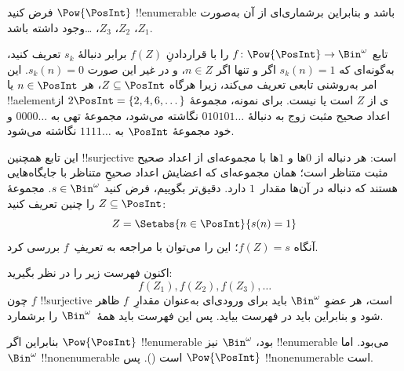  {
  فرض کنید $\Pow{\PosInt}$ !!{enumerable} باشد و بنابراین برشماری‌ای از
  آن به‌صورت $Z_{1}$، $Z_{2}$، $Z_{3}$، \dots وجود داشته باشد.

  تابع $f \colon \Pow{\PosInt} \to \Bin^\omega$ را با قراردادنِ
  $f(Z)$ برابر دنبالهٔ $s_{k}$ تعریف کنید، به‌گونه‌ای که $s_{k}(n) = 1$ اگر و تنها
  اگر $n \in Z$، و در غیر این صورت $s_k(n) = 0$. این امر به‌روشنی تابعی
  تعریف می‌کند، زیرا هرگاه $Z \subseteq \PosInt$، هر $n \in \PosInt$ یا
  !!a{element}ی از $Z$ است یا نیست. برای نمونه، مجموعهٔ $2\PosInt = \{2,
  4, 6, \dots\}$ از اعداد صحیح مثبت زوج به دنبالهٔ $010101\dots$ نگاشته
  می‌شود، مجموعهٔ تهی به $0000\dots$ و خود مجموعهٔ $\PosInt$ به
  $1111\dots$ نگاشته می‌شود.

  این تابع همچنین !!{surjective} است: هر دنباله از $0$ها و $1$ها با
  مجموعه‌ای از اعداد صحیح مثبت متناظر است؛ همان مجموعه‌ای که اعضایش
  اعداد صحیحِ متناظر با جایگاه‌هایی هستند که دنباله در آن‌ها مقدار~$1$
  دارد. دقیق‌تر بگوییم، فرض کنید $s \in \Bin^\omega$. مجموعهٔ $Z
  \subseteq \PosInt$ را چنین تعریف کنید:
  \[
  Z = \Setabs{n \in \PosInt}{s(n) = 1}
  \]
  آنگاه $f(Z) = s$؛ این را می‌توان با مراجعه به تعریفِ~$f$ بررسی کرد.

  اکنون فهرست زیر را در نظر بگیرید:
  \[
  f(Z_1), f(Z_2), f(Z_3), \dots
  \]
  چون $f$ !!{surjective} است، هر عضوِ $\Bin^\omega$ باید برای ورودی‌ای
  به‌عنوان مقدارِ~$f$ ظاهر شود و بنابراین باید در فهرست بیاید. پس این
  فهرست باید همهٔ~$\Bin^\omega$ را برشمارد.

  بنابراین اگر $\Pow{\PosInt}$ !!{enumerable} بود، $\Bin^\omega$ نیز
  !!{enumerable} می‌بود. اما $\Bin^\omega$ !!{nonenumerable} است
  (). پس $\Pow{\PosInt}$
  !!{nonenumerable} است.
 }
